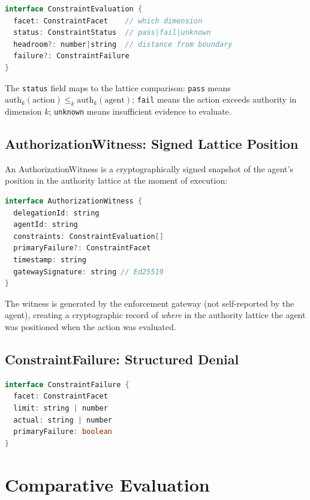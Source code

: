 \documentclass[sigconf,nonacm]{acmart}
\begin{document}
\begin{lstlisting}[language=Java,caption=ConstraintVector type]
interface ConstraintEvaluation {
  facet: ConstraintFacet    // which dimension
  status: ConstraintStatus  // pass|fail|unknown
  headroom?: number|string  // distance from boundary
  failure?: ConstraintFailure
}
\end{lstlisting}

The \texttt{status} field maps to the lattice comparison:
\texttt{pass} means $\text{auth}_k(\text{action}) \leq_k \text{auth}_k(\text{agent})$;
\texttt{fail} means the action exceeds authority in dimension $k$;
\texttt{unknown} means insufficient evidence to evaluate.

\subsection{AuthorizationWitness: Signed Lattice Position}

An AuthorizationWitness is a cryptographically signed snapshot of the agent's position
in the authority lattice at the moment of execution:

\begin{lstlisting}[language=Java,caption=AuthorizationWitness type]
interface AuthorizationWitness {
  delegationId: string
  agentId: string
  constraints: ConstraintEvaluation[]
  primaryFailure?: ConstraintFacet
  timestamp: string
  gatewaySignature: string // Ed25519
}
\end{lstlisting}

The witness is generated by the enforcement gateway (not self-reported by the agent),
creating a cryptographic record of \emph{where} in the authority lattice the agent was
positioned when the action was evaluated.

\subsection{ConstraintFailure: Structured Denial}

\begin{lstlisting}[language=Java,caption=ConstraintFailure type]
interface ConstraintFailure {
  facet: ConstraintFacet
  limit: string | number
  actual: string | number
  primaryFailure: boolean
}
\end{lstlisting}

\section{Comparative Evaluation}
\end{document}
